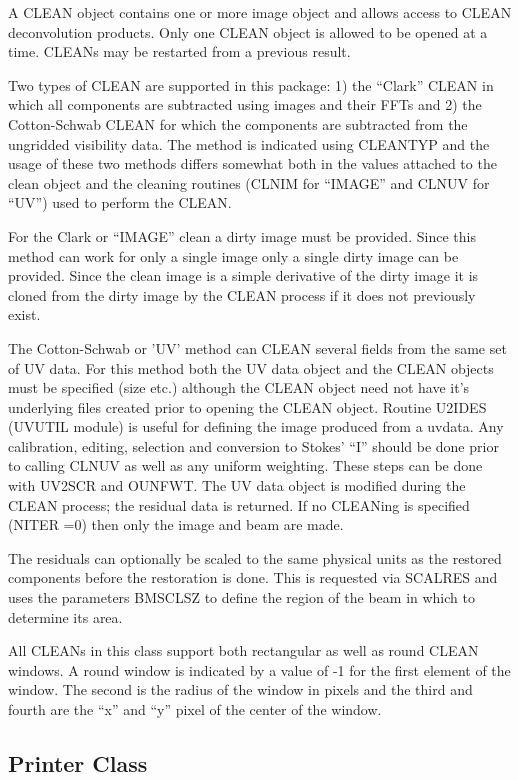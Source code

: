     A CLEAN object contains one or more image object and allows access
to CLEAN deconvolution products.  Only one CLEAN object is allowed
to be opened at a time. CLEANs may be restarted from a previous
result.

    Two types of CLEAN are supported in this package: 1) the ``Clark''
CLEAN in which all components are subtracted using images and
their FFTs and 2) the Cotton-Schwab CLEAN for which the
components are subtracted from the ungridded visibility data.
The method is indicated using CLEANTYP and the usage of these two
methods differs somewhat both in the values attached to the clean
object and the cleaning routines (CLNIM for ``IMAGE'' and CLNUV for
``UV'') used to perform the CLEAN.

   For the Clark or ``IMAGE'' clean a dirty image must be provided.
Since this method can work for only a single image only a single
dirty image can be provided.  Since the clean image is a simple
derivative of the dirty image it is cloned from the dirty image by
the CLEAN process if it does not previously exist.

   The Cotton-Schwab or 'UV' method can CLEAN several fields from
the same set of UV data.  For this method both the UV data object
and the CLEAN objects must be specified (size etc.) although the
CLEAN object need not have it's underlying files created prior to
opening the CLEAN object.  Routine U2IDES (UVUTIL module) is useful
for defining the image produced from a uvdata.  Any calibration,
editing, selection and conversion to Stokes' ``I'' should be done
prior to calling CLNUV as well as any uniform weighting.  These steps
can be done with UV2SCR and OUNFWT. The UV data object is modified
during the CLEAN process; the residual data is returned.  If no
CLEANing is specified (NITER =0)  then only the image and beam are
made.

     The residuals can optionally be scaled to the same physical
units as the restored components before the restoration is done.
This is requested via SCALRES and uses the parameters BMSCLSZ to
define the region of the beam in which to determine its area.

   All CLEANs in this class support both rectangular as well as round
CLEAN windows.  A round window is indicated by a value of -1 for the
first element of the window.  The second is the radius of the window
in pixels and the third and fourth are the ``x'' and ``y'' pixel of
the center of the window.

\subsection{Printer Class}

